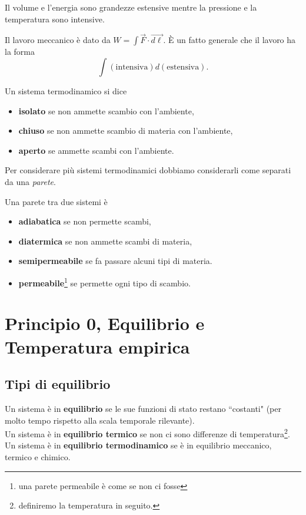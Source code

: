 \begin{example}
Il volume e l'energia sono grandezze estensive mentre la pressione e la temperatura sono intensive.
\end{example}

\begin{remark}
Il lavoro meccanico \`e dato da $W=\int \vec F\cdot \vec{d\ell}$. \`E un fatto generale che il lavoro ha la forma
\[\int(\text{intensiva})d(\text{estensiva}).\]
\end{remark}

\begin{definition}
Un sistema termodinamico si dice 
\begin{itemize}
\item \textbf{isolato} se non ammette scambio con l'ambiente,
\item \textbf{chiuso} se non ammette scambio di materia con l'ambiente,
\item \textbf{aperto} se ammette scambi con l'ambiente.
\end{itemize}
\end{definition}

Per considerare pi\`u sistemi termodinamici dobbiamo considerarli come separati da una \textit{parete}.

\begin{definition}
Una parete tra due sistemi \`e
\begin{itemize}
\item \textbf{adiabatica} se non permette scambi,
\item \textbf{diatermica} se non ammette scambi di materia,
\item \textbf{semipermeabile} se fa passare alcuni tipi di materia.
\item \textbf{permeabile}\footnote{una parete permeabile \`e come se non ci fosse} se permette ogni tipo di scambio.
\end{itemize}
\end{definition}

\section{Principio 0, Equilibrio e Temperatura empirica}
\subsection{Tipi di equilibrio}
\begin{definition}[Equilibrio]
Un sistema \`e in \textbf{equilibrio} se le sue funzioni di stato restano ``costanti" (per molto tempo rispetto alla scala temporale rilevante).\\
Un sistema \`e in \textbf{equilibrio termico} se non ci sono differenze di temperatura\footnote{definiremo la temperatura in seguito.}.\\
Un sistema \`e in \textbf{equilibrio termodinamico} se \`e in equilibrio meccanico, termico e chimico.
\end{definition}


